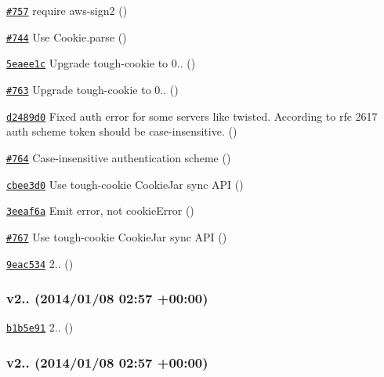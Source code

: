\begin{DoxyItemize}
\item \href{https://github.com/mikeal/request/pull/757}{\tt \#757} require aws-\/sign2 ()
\item \href{https://github.com/mikeal/request/pull/744}{\tt \#744} Use Cookie.\+parse ()
\item \href{https://github.com/mikeal/request/commit/5eaee1ce4008ede1df15201622ac478c892d6a8a}{\tt 5eaee1c} Upgrade tough-\/cookie to 0.. ()
\item \href{https://github.com/mikeal/request/pull/763}{\tt \#763} Upgrade tough-\/cookie to 0.. ()
\item \href{https://github.com/mikeal/request/commit/d2489d0e24d9a538224f5c8c090dcdeb1f8d4969}{\tt d2489d0} Fixed auth error for some servers like twisted. According to rfc 2617 auth scheme token should be case-\/insensitive. ()
\item \href{https://github.com/mikeal/request/pull/764}{\tt \#764} Case-\/insensitive authentication scheme ()
\item \href{https://github.com/mikeal/request/commit/cbee3d04ee9f704501a64edb7b9b6d201e98494b}{\tt cbee3d0} Use tough-\/cookie Cookie\+Jar sync A\+P\+I ()
\item \href{https://github.com/mikeal/request/commit/3eeaf6a90df7b806d91ae1e8e2f56862ece2ea33}{\tt 3eeaf6a} Emit error, not cookie\+Error ()
\item \href{https://github.com/mikeal/request/pull/767}{\tt \#767} Use tough-\/cookie Cookie\+Jar sync A\+P\+I ()
\item \href{https://github.com/mikeal/request/commit/9eac534dd11e40bba65456491cb62ad68d8f41fa}{\tt 9eac534} 2.. ()
\end{DoxyItemize}

\subsubsection*{v2.. (2014/01/08 02\+:57 +00\+:00)}


\begin{DoxyItemize}
\item \href{https://github.com/mikeal/request/commit/b1b5e9161e149574ba5528c401a70bfadef1a98a}{\tt b1b5e91} 2.. ()
\end{DoxyItemize}

\subsubsection*{v2.. (2014/01/08 02\+:57 +00\+:00)}


